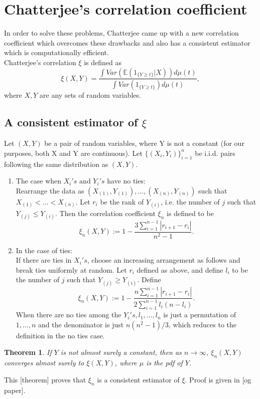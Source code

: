 \documentclass{article}
\newtheorem{theorem}{Theorem}[section]
\begin{document}
\section{Chatterjee's correlation coefficient}
	In order to solve these problems, Chatterjee came up with a new correlation coefficient which overcomes these drawbacks and also has a consistent estimator which is computationally efficient.\\
	Chatterjee's correlation $\xi$ is defined as
	$$\xi(X, Y) = \frac{\int Var(\mathbb{E}(1_{\{Y \geq t\}}|X)) d\mu(t)}{\int Var(1_{\{Y \geq t\}}) d\mu(t)},$$
	where $X, Y$ are any sets of random variables.

	\subsection{A consistent estimator of $\xi$}
		Let $(X, Y)$ be a pair of random variables, where Y is not a constant (for our purposes, both X and Y are continuous).
		Let $\{(X_i, Y_i)\}_{i = 1}^{n}$ be i.i.d. pairs following the same distribution as $(X, Y)$.
		\begin{enumerate}
			\item The case when $X_i's \text{ and } Y_i's$ have no ties: \\
			Rearrange the data as $(X_{(1)}, Y_{(1)}), \dots, (X_{(n)}, Y_{(n)})$ such that $X_{(1)} < \dots < X_{(n)}$. Let $r_i$ be the rank of $Y_{(i)}$, i.e. the number of $j$ such that $Y_{(j)} \leq Y_{(i)}$.  Then the correlation coefficient $\xi_n$ is defined to be
			$$\xi_n(X, Y) := 1-\frac{3\sum_{i=1}^{n-1} |r_{i+1} - r_i|}{n^2-1}.$$

			\item In the case of ties:\\
			If there are ties in $X_i's$, choose an increasing arrangement as follows and break ties uniformly at random. Let $r_i$ defined as above, and define $l_i$ to be the number of $j$ such that $Y_{(j)} \geq Y_{(i)}$. Define
			$$\xi_n(X, Y) := 1-\frac{n\sum_{i=1}^{n-1} |r_{i+1} - r_i|}{2\sum_{i=1}^{n-1}l_i(n-l_i)}.$$
			When there are no ties among the $Y_i's, l_1, \dots, l_n$ is just a permutation of $1, \dots, n$ and the denominator is just $n(n^2-1)/3$, which reduces to the definition in the no ties case.\\
		\end{enumerate}
		\begin{theorem}
			If $Y$ is not almost surely a constant, then as $n \rightarrow \infty$, $\xi_n(X, Y)$ converges almost surely to $\xi(X, Y)$, where $\mu$ is the pdf of $Y$.
		\end{theorem}
		This [theorem] proves that $\xi_n$ is a consistent estimator of $\xi$. Proof is given in [og paper].
\end{document}
